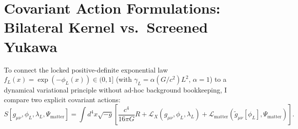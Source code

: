 \documentclass[10pt,a4paper]{article}
\begin{document}
\section{Covariant Action Formulations: Bilateral Kernel vs.\ Screened Yukawa}
To connect the locked positive-definite exponential law $f_L(x) = \exp(-\phi_L(x)) \in (0,1]$ (with $\gamma_L = \alpha (G/c^2)L^2$, $\alpha=1$) to a dynamical variational principle without ad-hoc background bookkeeping, I compare two explicit covariant actions:
\begin{equation}
  S[g_{\mu\nu}, \phi_L, \lambda_L, \Psi_{\text{matter}}] = \int d^4x\sqrt{-g}\left[\frac{c^4}{16\pi G}R + \mathcal{L}_X(g_{\mu\nu}, \phi_L, \lambda_L) + \mathcal{L}_{\text{matter}}\!\left(\tilde{g}_{\mu\nu}[\phi_L], \Psi_{\text{matter}}\right)\right].
\end{equation}
\end{document}
